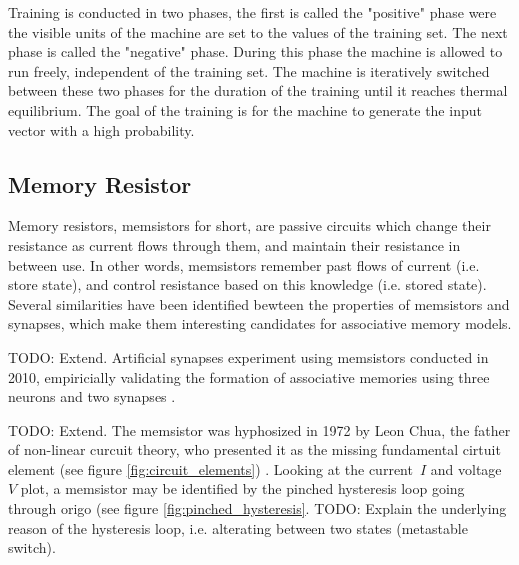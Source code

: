 \documentclass[12pt, a4paper]{article}
\begin{document}

Training is conducted in two phases, the first is called the "positive" phase were the visible units of the machine are set to the values of the training set. The next phase is called the "negative" phase. During this phase the machine is allowed to run freely, independent of the training set. The machine is iteratively switched between these two phases for the duration of the training until it reaches thermal equilibrium. The goal of the training is for the machine to generate the input vector with a high probability.


\subsection{Memory Resistor}


Memory resistors, memsistors for short, are passive circuits which change their resistance as current flows through them, and maintain their resistance in between use. In other words, memsistors remember past flows of current (i.e. store state), and control resistance based on this knowledge (i.e. stored state). Several similarities have been identified bewteen the properties of memsistors and synapses, which make them interesting candidates for associative memory models.

TODO: Extend. Artificial synapses experiment using memsistors conducted in 2010, empiricially validating the formation of associative memories using three neurons and two synapses \cite{memristor_conditioning}.

TODO: Extend. The memsistor was hyphosized in 1972 by Leon Chua, the father of non-linear curcuit theory, who presented it as the missing fundamental cirtuit element (see figure \ref{fig:circuit_elements}) \cite{chua_memristor}. Looking at the current~$I$ and voltage~$V$ plot, a memsistor may be identified by the pinched hysteresis loop going through origo (see figure \ref{fig:pinched_hysteresis}. TODO: Explain the underlying reason of the hysteresis loop, i.e. alterating between two states (metastable switch).
\end{document}
